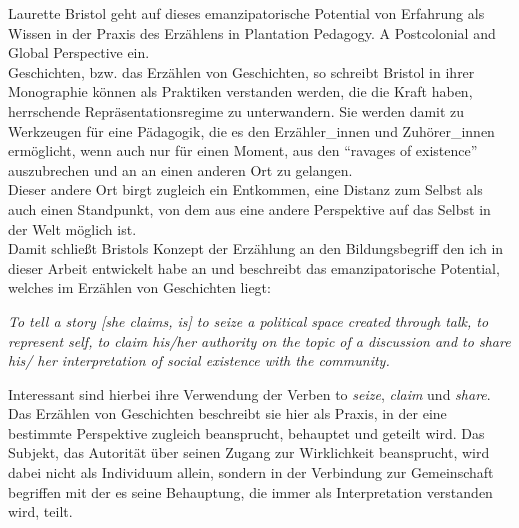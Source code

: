   Laurette Bristol geht auf dieses emanzipatorische Potential von Erfahrung als
  Wissen in der Praxis des Erzählens  in  \glqq Plantation Pedagogy. A Postcolonial
  and Global Perspective\grqq\footnotemark {} ein.\\
  Geschichten, bzw. das Erzählen von Geschichten, so schreibt Bristol in ihrer
  Monographie können als Praktiken verstanden werden, die die Kraft haben,
  herrschende Repräsentationsregime zu unterwandern. Sie werden damit zu
  Werkzeugen für eine Pädagogik, die es den Erzähler\_innen und Zuhörer\_innen
  ermöglicht, wenn auch nur für einen Moment, aus den “ravages of
  existence”\footnotemark {}
  auszubrechen und an an einen anderen Ort zu gelangen. \\
  Dieser andere Ort birgt
  zugleich ein Entkommen, eine Distanz zum Selbst  als auch einen Standpunkt,
  von dem aus eine andere Perspektive auf das Selbst in der Welt möglich ist.\\

  \noindent Damit schließt Bristols Konzept der Erzählung an den Bildungsbegriff den ich in dieser Arbeit entwickelt habe an und beschreibt das emanzipatorische
  Potential, welches im Erzählen von Geschichten liegt:
  \begin{myenv}
\textit{\glqq To tell a story [she claims, is] to seize a political space
  created through talk, to represent self, to claim his/her authority on
  the topic of a discussion and to share his/ her interpretation of social
existence with the community.\grqq\footnotemark {}} 
\end{myenv}
Interessant sind hierbei ihre Verwendung der Verben to \textit{seize},
\textit{claim} und \textit{share}.
Das Erzählen von Geschichten beschreibt sie hier als Praxis, in der eine
bestimmte Perspektive zugleich beansprucht, behauptet und geteilt wird. Das
Subjekt, das Autorität über seinen Zugang zur Wirklichkeit beansprucht, wird
dabei nicht als Individuum allein, sondern in der Verbindung zur Gemeinschaft
begriffen mit der es seine Behauptung, die immer als Interpretation verstanden wird, teilt.\\

